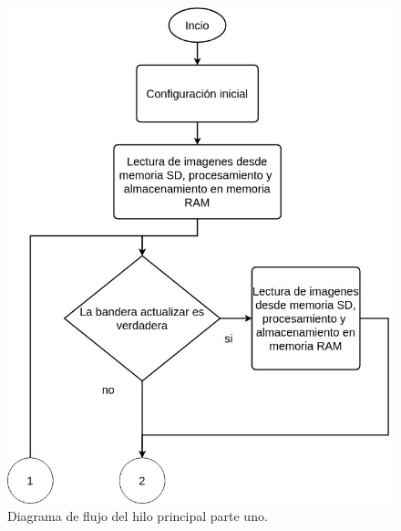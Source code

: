 \begin{figure}[htpb]
	\centering
	\includegraphics[scale=0.6]{Figures/hilo1parte1.jpg} 
	\caption{Diagrama de flujo del hilo principal parte uno.}
	\label{fig: hiloprincipal1}
\end{figure}
